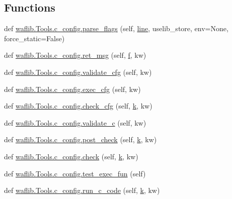 \subsection*{Functions}
\begin{DoxyCompactItemize}
\item 
def \hyperlink{namespacewaflib_1_1_tools_1_1c__config_adf5bcd2436b90068916413371f93e301}{waflib.\+Tools.\+c\+\_\+config.\+parse\+\_\+flags} (self, \hyperlink{seqread_8c_aad9ebcdde542d8b2075615388ff15a9c}{line}, uselib\+\_\+store, env=None, force\+\_\+static=False)
\item 
def \hyperlink{namespacewaflib_1_1_tools_1_1c__config_a924e6953e17a1a202a055b8766ef14f3}{waflib.\+Tools.\+c\+\_\+config.\+ret\+\_\+msg} (self, \hyperlink{checksum_8c_ae747d72a1a803f5ff4a4b2602857d93b}{f}, kw)
\item 
def \hyperlink{namespacewaflib_1_1_tools_1_1c__config_a34a3a7a75758108d6280b678358f4775}{waflib.\+Tools.\+c\+\_\+config.\+validate\+\_\+cfg} (self, kw)
\item 
def \hyperlink{namespacewaflib_1_1_tools_1_1c__config_af864d6c2f284deb99bc53fc66e27e02c}{waflib.\+Tools.\+c\+\_\+config.\+exec\+\_\+cfg} (self, kw)
\item 
def \hyperlink{namespacewaflib_1_1_tools_1_1c__config_a9777baf7979ba89362dbaf66891281d9}{waflib.\+Tools.\+c\+\_\+config.\+check\+\_\+cfg} (self, \hyperlink{rfft2d_test_m_l_8m_adc468c70fb574ebd07287b38d0d0676d}{k}, kw)
\item 
def \hyperlink{namespacewaflib_1_1_tools_1_1c__config_aa8c8896ca3170069a0f20b8a27ad2690}{waflib.\+Tools.\+c\+\_\+config.\+validate\+\_\+c} (self, kw)
\item 
def \hyperlink{namespacewaflib_1_1_tools_1_1c__config_a007f8b5aab4b03ad5b428be9e9e56fd4}{waflib.\+Tools.\+c\+\_\+config.\+post\+\_\+check} (self, \hyperlink{rfft2d_test_m_l_8m_adc468c70fb574ebd07287b38d0d0676d}{k}, kw)
\item 
def \hyperlink{namespacewaflib_1_1_tools_1_1c__config_a58859fd21b5419c38f4c77256ce3893b}{waflib.\+Tools.\+c\+\_\+config.\+check} (self, \hyperlink{rfft2d_test_m_l_8m_adc468c70fb574ebd07287b38d0d0676d}{k}, kw)
\item 
def \hyperlink{namespacewaflib_1_1_tools_1_1c__config_aca45fb00c52fe9345fba913b79c465dd}{waflib.\+Tools.\+c\+\_\+config.\+test\+\_\+exec\+\_\+fun} (self)
\item 
def \hyperlink{namespacewaflib_1_1_tools_1_1c__config_acd53ac9edce84551c4bf87b21854c6b8}{waflib.\+Tools.\+c\+\_\+config.\+run\+\_\+c\+\_\+code} (self, \hyperlink{rfft2d_test_m_l_8m_adc468c70fb574ebd07287b38d0d0676d}{k}, kw)

\end{DoxyCompactItemize}
